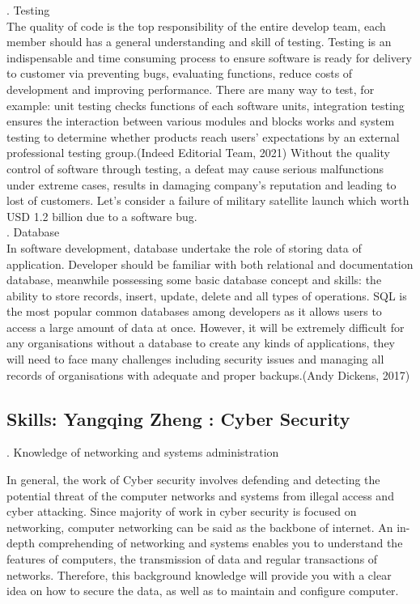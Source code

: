 \documentclass[a4paper, 11pt]{report}
\begin{document}
. Testing \\
\noindent The quality of code is the top responsibility of the entire develop team, each member should has a general understanding and skill of testing. Testing is an indispensable and time consuming process to ensure software is ready for delivery to customer via preventing bugs, evaluating functions, reduce costs of development and improving performance. There are many way to test, for example: unit testing checks functions of each software units, integration testing ensures the interaction between various modules and blocks works and system testing to determine whether products reach users' expectations by an external professional testing group.(Indeed Editorial Team, 2021) Without the quality control of software through testing, a defeat may cause serious malfunctions under extreme cases, results in damaging company's reputation and leading to lost of customers. Let's consider a failure of military satellite launch which worth USD 1.2 billion due to a software bug.\\

. Database\\
\noindent In software development, database undertake the role of storing data of application. Developer should be familiar with both relational and documentation database, meanwhile possessing some basic database concept and skills: the ability to store records, insert, update, delete and all types of operations. SQL is the most popular common databases among developers as it allows users to access a large amount of data at once. However, it will be extremely difficult for any organisations without a database to create any kinds of applications, they will need to face many challenges including security issues and managing all records of organisations with adequate and proper backups.(Andy Dickens, 2017)\\


\subsection{Skills: Yangqing Zheng : Cyber Security}

. Knowledge of networking and systems administration

\noindent In general, the work of Cyber security involves defending and detecting the potential threat of the computer networks and systems from illegal access and cyber attacking. Since majority of work in cyber security is focused on networking, computer networking can be said as the backbone of internet. An in-depth comprehending of networking and systems enables you to understand the features of computers, the transmission of data and regular transactions of networks. Therefore, this background knowledge will provide you with a clear idea on how to secure the data, as well as to maintain and configure computer. \\
\end{document}
